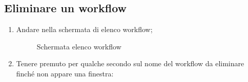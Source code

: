\subsection{Eliminare un workflow}
\begin{enumerate}
	\item Andare nella schermata di elenco workflow;
	\begin{figure}[!ht]
		\centering
		\caption{Schermata elenco workflow}
	\end{figure}
	\item Tenere premuto per qualche secondo sul nome del workflow da eliminare finché non appare una finestra:
	\begin{enumerate}

\end{enumerate}
\end{enumerate}
